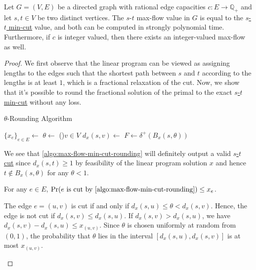 \begin{theorem}\label{thm:max-flow-min-cut}
	Let \(G = (V, E)\) be a directed graph with rational edge capacities \(c \colon E \to \mathbb{Q} _+\) and let \(s, t\in V\) be two distinct vertices. The \(s\)-\(t\) max-flow value in \(G\) is equal to the \hyperref[prb:s-t-min-cut]{\(s\)-\(t\) min-cut} value, and both can be computed in strongly polynomial time. Furthermore, if \(c\) is integer valued, then there exists an integer-valued max-flow as well.
\end{theorem}
\begin{proof}
	We first observe that the linear program can be viewed as assigning lengths to the edges such that the shortest path between \(s\) and \(t\) according to the lengths is at least \(1\), which is a fractional relaxation of the cut. Now, we show that it's possible to round the fractional solution of the primal to the exact \hyperref[prb:s-t-min-cut]{\(s\)-\(t\) min-cut} without any loss.

	\begin{algorithm}[H]\label{algo:max-flow-min-cut-rounding}
		\DontPrintSemicolon{}
		\caption{\(\theta \)-Rounding Algorithm}

		\BlankLine

		\(\{ x_e \} _{e\in E} \gets\)
		\(\theta \gets\)\;
		\For(){\(v \in V\)}{
			\(d_x(s, v) \gets\)\;
		}
		\(F\gets \delta ^+(B_x(s, \theta ))\)
		\;
	\end{algorithm}

	We see that \autoref{algo:max-flow-min-cut-rounding} will definitely output a valid \hyperref[prb:s-t-min-cut]{\(s\)-\(t\) cut} since \(d_x(s, t) \geq 1\) by feasibility of the linear program solution \(x\) and hence \(t \notin B_x(s, \theta )\) for any \(\theta < 1\).

	\begin{claim}
		For any \(e \in E\), \(\Pr(e \text{ is cut by \autoref{algo:max-flow-min-cut-rounding}} ) \leq x_e\).
	\end{claim}
	\begin{explanation}
		The edge \(e = (u, v)\) is cut if and only if \(d_x(s, u) \leq \theta < d_x(s, v)\). Hence, the edge is not cut if \(d_x(s, v) \leq d_x(s, u)\). If \(d_x(s, v) > d_x(s, u)\), we have \(d_x(s, v) - d_x(s, u) \leq x_{(u, v)}\). Since \(\theta \) is chosen uniformly at random from \((0, 1)\), the probability that \(\theta \) lies in the interval \([d_x(s, u), d_x(s, v)]\) is at most \(x_{(u, v)}\).
	\end{explanation}


\end{proof}
